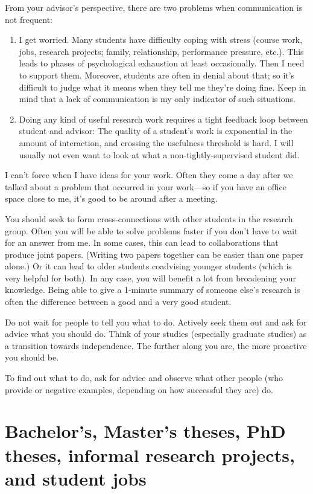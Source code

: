 \documentclass[12pt]{article}
\begin{document}
From your advisor's perspective, there are two problems when communication is not frequent:
\begin{enumerate}
\item I get worried. Many students have difficulty coping with stress (course work, jobs, research projects; family, relationship, performance pressure, etc.). This leads to phases of psychological exhaustion at least occasionally. Then I need to support them. Moreover, students are often in denial about that; so it's difficult to judge what it means when they tell me they're doing fine. Keep in mind that a lack of communication is my only indicator of such situations.
\item Doing any kind of useful research work requires a tight feedback loop between student and advisor: The quality of a student's work is exponential in the amount of interaction, and crossing the usefulness threshold is hard. I will usually not even want to look at what a non-tightly-supervised student did.
\end{enumerate}
I can't force when I have ideas for your work. Often they come a day after we talked about a problem that occurred in your work---so if you have an office space close to me, it's good to be around after a meeting.
\medskip

You should seek to form cross-connections with other students in the research group.
Often you will be able to solve problems faster if you don't have to wait for an answer from me.
In some cases, this can lead to collaborations that produce joint papers. (Writing two papers together can be easier than one paper alone.)
Or it can lead to older students coadvising younger students (which is very helpful for both).
In any case, you will benefit a lot from broadening your knowledge.
Being able to give a 1-minute summary of someone else's research is often the difference between a good and a very good student.
\medskip

Do not wait for people to tell you what to do.
Actively seek them out and ask for advice what you should do.
Think of your studies (especially graduate studies) as a transition towards independence.
The further along you are, the more proactive you should be.

To find out what to do, ask for advice and observe what other people (who provide or negative examples, depending on how successful they are) do.

\section{Bachelor's, Master's theses, PhD theses, informal research projects, and student jobs}
\end{document}
